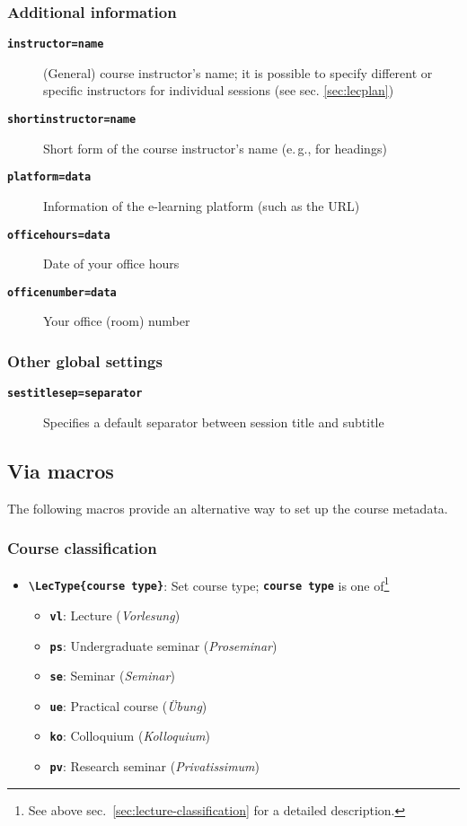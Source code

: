 \documentclass[english]{article}
\newcommand*\jmacro[1]{\textbf{\texttt{#1}}}
\newcommand*\jcsmacro[1]{\jmacro{\textbackslash{#1}}}
\newcommand*\joption[1]{\textbf{\texttt{#1}}}
\newcommand*\jparam[1]{\angus #1\angud}
\begin{document}
\subsubsection{Additional information}
\begin{description}
\item [\joption{instructor=\jparam{name}}] (General) course instructor's name;
      it is possible to specify different or specific instructors for individual sessions
      (see sec. \ref{sec:lecplan})
\item [\joption{shortinstructor=\jparam{name}}] Short form of the course instructor's name (e.\,g., for headings)
\item [\joption{platform=\jparam{data}}] Information of the e-learning platform
      (such as the URL)
\item [\joption{officehours=\jparam{data}}] Date of your office hours
\item [\joption{officenumber=\jparam{data}}] Your office (room) number
\end{description}

\subsubsection{Other global settings}
\begin{description}
	\item[\joption{sestitlesep=\jparam{separator}}] Specifies a default separator between session title and subtitle
\end{description}

\subsection{Via macros\label{sec:via-macros}}

The following macros provide an alternative way to set up the course metadata.

\subsubsection{Course classification}
\begin{itemize}
\item \jcsmacro{LecType\{\jparam{course type}\}}: Set course type;
\joption{\jparam{course type}} is one of\footnote{See above sec.~\ref{sec:lecture-classification} for a detailed
description.}

\begin{itemize}
\item \joption{vl}: Lecture (\emph{Vorlesung})
\item \joption{ps}: Undergraduate seminar (\emph{Proseminar})
\item \joption{se}: Seminar (\emph{Seminar})
\item \joption{ue}: Practical course (\emph{Übung})
\item \joption{ko}: Colloquium (\emph{Kolloquium})
\item \joption{pv}: Research seminar (\emph{Privatissimum})
\end{itemize}
\end{itemize}
\end{document}

